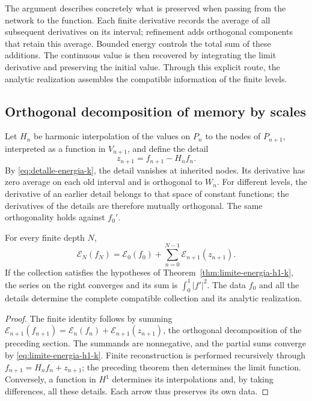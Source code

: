 The argument describes concretely what is preserved when passing from
the network to the function. Each finite derivative records the average
of all subsequent derivatives on its interval; refinement adds orthogonal
components that retain this average. Bounded energy controls the total
sum of these additions. The continuous value is then recovered by
integrating the limit derivative and preserving the initial value.
Through this explicit route, the analytic realization assembles the
compatible information of the finite levels.

\subsection{Orthogonal decomposition of memory by scales}

Let \(H_n\) be harmonic interpolation of the values on \(P_n\)
to the nodes of \(P_{n+1}\), interpreted as a function in
\(V_{n+1}\), and define the detail
\[
 z_{n+1}=f_{n+1}-H_nf_n.
\]
By \eqref{eq:detalle-energia-k}, the detail vanishes at inherited
nodes. Its derivative has zero average on each old interval and is
orthogonal to \(W_n\). For different levels, the derivative of an
earlier detail belongs to that space of constant functions; the
derivatives of the details are therefore mutually orthogonal.
The same orthogonality holds against \(f_0'\).

\begin{proposition}
\label{prop:memoria-energetica-escalas-k}
For every finite depth \(N\),
\begin{equation}
 \mathcal E_N(f_N)
 =\mathcal E_0(f_0)
 +\sum_{n=0}^{N-1}\mathcal E_{n+1}(z_{n+1}).
 \label{eq:energia-telescopica-detalles-k}
\end{equation}
If the collection satisfies the hypotheses of
Theorem~\ref{thm:limite-energia-h1-k}, the series on the right
converges and its sum is \(\int_0^1|f'|^2\). The data \(f_0\)
and all the details determine the complete compatible collection and
its analytic realization.
\end{proposition}
\begin{proof}
The finite identity follows by summing
\(\mathcal E_{n+1}(f_{n+1})
=\mathcal E_n(f_n)+\mathcal E_{n+1}(z_{n+1})\), the orthogonal
decomposition of the preceding section. The summands are nonnegative,
and the partial sums converge by \eqref{eq:limite-energia-h1-k}.
Finite reconstruction is performed recursively through
\(f_{n+1}=H_nf_n+z_{n+1}\); the preceding theorem then determines
the limit function. Conversely, a function in \(H^1\) determines
its interpolations and, by taking differences, all these details.
Each arrow thus preserves its own data.
\end{proof}

